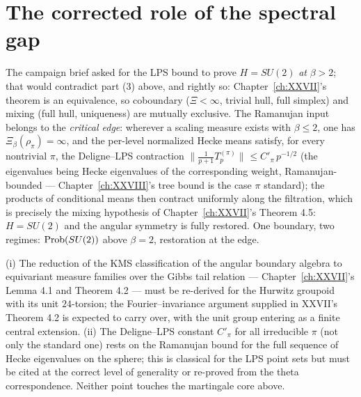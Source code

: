 \section{The corrected role of the spectral gap}\label{XXXVI:sec:LPS}

The campaign brief asked for the LPS bound to prove $H=SU(2)$ \emph{at} $\beta>2$; that
would contradict part (3) above, and rightly so: Chapter~\ref{ch:XXVII}'s theorem is an
equivalence, so coboundary ($\Xi<\infty$, trivial hull, full simplex) and mixing (full
hull, uniqueness) are mutually exclusive. The Ramanujan input belongs to the
\emph{critical edge}: wherever a scaling measure exists with $\beta\le2$, one has
$\Xi_\beta(\rho_\pi)=\infty$, and the per-level normalized Hecke means satisfy, for
every nontrivial $\pi$, the Deligne--LPS contraction \cite{LPS}
$\bigl\|\tfrac1{p+1}T_p^{(\pi)}\bigr\|_{}\le C'_\pi\,p^{-1/2}$
(the eigenvalues being Hecke eigenvalues of the corresponding weight, Ramanujan-bounded
--- Chapter~\ref{ch:XXVIII}'s tree bound is the case $\pi$ standard); the products of conditional
means then contract uniformly along the filtration, which is precisely the mixing
hypothesis of Chapter~\ref{ch:XXVII}'s Theorem 4.5: $H=SU(2)$ and the angular symmetry is fully
restored. One boundary, two regimes: $\mathrm{Prob}(SU(2))$ above $\beta=2$, restoration at the
edge.

\begin{remark}\label{XXXVI:rem:honest}
(i) The reduction of the KMS classification of the angular boundary algebra to
equivariant measure families over the Gibbs tail relation --- Chapter~\ref{ch:XXVII}'s Lemma 4.1
and Theorem 4.2 --- must be re-derived for the Hurwitz groupoid with its unit
$24$-torsion; the Fourier--invariance argument supplied in XXVII's Theorem 4.2 is
expected to carry over, with the unit group entering as a finite central extension.
(ii) The Deligne--LPS constant $C'_\pi$ for all irreducible $\pi$ (not only the standard
one) rests on the Ramanujan bound for the full sequence of Hecke eigenvalues on the
sphere; this is classical for the LPS point sets but must be cited at the correct level
of generality or re-proved from the theta correspondence. Neither point touches the
martingale core above.
\end{remark}

